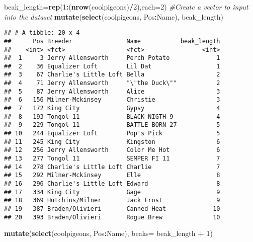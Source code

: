 \documentclass[]{article}
\newenvironment{Shaded}{\begin{snugshade}}{\end{snugshade}}
\newcommand{\KeywordTok}[1]{\textcolor[rgb]{0.13,0.29,0.53}{\textbf{#1}}}
\newcommand{\DataTypeTok}[1]{\textcolor[rgb]{0.13,0.29,0.53}{#1}}
\newcommand{\DecValTok}[1]{\textcolor[rgb]{0.00,0.00,0.81}{#1}}
\newcommand{\StringTok}[1]{\textcolor[rgb]{0.31,0.60,0.02}{#1}}
\newcommand{\CommentTok}[1]{\textcolor[rgb]{0.56,0.35,0.01}{\textit{#1}}}
\newcommand{\OperatorTok}[1]{\textcolor[rgb]{0.81,0.36,0.00}{\textbf{#1}}}
\newcommand{\NormalTok}[1]{#1}
\begin{document}
\begin{Shaded}
\begin{Highlighting}[]
\NormalTok{beak_length=}\KeywordTok{rep}\NormalTok{(}\DecValTok{1}\OperatorTok{:}\NormalTok{(}\KeywordTok{nrow}\NormalTok{(coolpigeons)}\OperatorTok{/}\DecValTok{2}\NormalTok{),}\DataTypeTok{each=}\DecValTok{2}\NormalTok{) }\CommentTok{#Create a vector to input into the dataset}
\KeywordTok{mutate}\NormalTok{(}\KeywordTok{select}\NormalTok{(coolpigeons, Pos}\OperatorTok{:}\NormalTok{Name), beak_length)}
\end{Highlighting}
\end{Shaded}

\begin{verbatim}
## # A tibble: 20 x 4
##      Pos Breeder               Name           beak_length
##    <int> <fct>                 <fct>                <int>
##  1     3 Jerry Allensworth     Perch Potato             1
##  2    36 Equalizer Loft        Lil Dat                  1
##  3    67 Charlie's Little Loft Bella                    2
##  4    71 Jerry Allensworth     "\"the Duck\""           2
##  5    87 Jerry Allensworth     Alice                    3
##  6   156 Milner-Mckinsey       Christie                 3
##  7   172 King City             Gypsy                    4
##  8   193 Tongol 11             BLACK NIGTH 9            4
##  9   229 Tongol 11             BATTLE BORN 27           5
## 10   244 Equalizer Loft        Pop's Pick               5
## 11   245 King City             Kingston                 6
## 12   256 Jerry Allensworth     Color Me Hot             6
## 13   277 Tongol 11             SEMPER FI 11             7
## 14   278 Charlie's Little Loft Charlie                  7
## 15   292 Milner-Mckinsey       Elle                     8
## 16   296 Charlie's Little Loft Edward                   8
## 17   334 King City             Gage                     9
## 18   369 Hutchins/Milner       Jack Frost               9
## 19   387 Braden/Olivieri       Canned Heat             10
## 20   393 Braden/Olivieri       Rogue Brew              10
\end{verbatim}

\begin{Shaded}
\begin{Highlighting}[]
\KeywordTok{mutate}\NormalTok{(}\KeywordTok{select}\NormalTok{(coolpigeons, Pos}\OperatorTok{:}\NormalTok{Name), }\DataTypeTok{beaks=}\NormalTok{ beak_length }\OperatorTok{+}\StringTok{ }\DecValTok{1}\NormalTok{)}
\end{Highlighting}
\end{Shaded}
\end{document}
